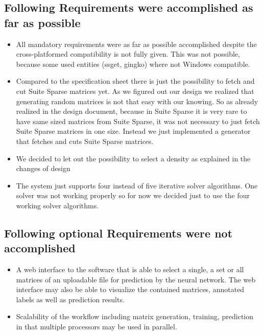 \documentclass[parskip=full]{scrartcl}
\begin{document}
\subsection{Following Requirements were accomplished as far as possible}
\begin{itemize}

\item All mandatory requirements were as far as possible accomplished despite the cross-platformed compatibility is not fully given. 
This was not possible, because some used entities (ssget, gingko) where not Windows compatible.

\item Compared to the specification sheet there is just the possibility to fetch and cut Suite Sparse matrices yet.
As we figured out our design we realized that generating random matrices is not that easy with our knowing.
So as already realized in the design document, because in Suite Sparse it is very rare to have same sized matrices from Suite Sparse, it was not necessary to just fetch Suite Sparse matrices in one size. 
Instead we just implemented a generator that fetches and cuts Suite Sparse matrices.

\item We decided to let out the possibility to select a density as explained in the changes of design

\item The system just supports four instead of five iterative solver algorithms.
One solver was not working properly so for now we decided just to use the four working solver algorithms.

\end{itemize}


\subsection{Following optional Requirements were not accomplished}
\begin{itemize}
\item A web interface to the software that is able to select a single, a set or all matrices of an uploadable file for prediction by the neural network. The web interface may also be able to visualize the contained matrices, annotated labels as well as prediction results.

\item Scalability of the workflow including matrix generation, training, prediction in that multiple processors may be used in parallel.

\end{itemize}
\end{document}
